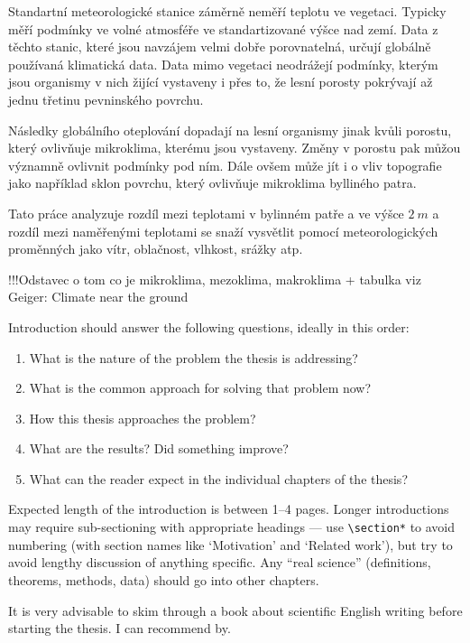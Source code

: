 Standartní meteorologické stanice záměrně neměří teplotu ve vegetaci. Typicky měří podmínky ve volné atmosféře ve standartizované výšce nad zemí. Data z těchto stanic, které jsou navzájem velmi dobře porovnatelná, určují globálně používaná klimatická data. Data mimo vegetaci neodrážejí podmínky, kterým jsou organismy v nich žijící vystaveny i přes to, že lesní porosty pokrývají až jednu třetinu pevninského povrchu.



Následky globálního oteplování dopadají na lesní organismy jinak kvůli porostu, který ovlivňuje mikroklima, kterému jsou vystaveny. Změny v porostu pak můžou významně ovlivnit podmínky pod ním. Dále ovšem může jít i o vliv topografie jako například sklon povrchu, který ovlivňuje mikroklima bylliného patra. 

Tato práce analyzuje rozdíl mezi teplotami v bylinném patře a ve výšce $\SI{2}{m}$ a rozdíl mezi naměřenými teplotami se snaží vysvětlit pomocí meteorologických proměnných jako vítr, oblačnost, vlhkost, srážky atp. 


!!!Odstavec o tom co je mikroklima, mezoklima, makroklima + tabulka viz Geiger: Climate near the ground



Introduction should answer the following questions, ideally in this order:
\begin{enumerate}
\item What is the nature of the problem the thesis is addressing?
\item What is the common approach for solving that problem now?
\item How this thesis approaches the problem?
\item What are the results? Did something improve?
\item What can the reader expect in the individual chapters of the thesis?
\end{enumerate}

Expected length of the introduction is between 1--4 pages. Longer introductions may require sub-sectioning with appropriate headings --- use \texttt{\textbackslash{}section*} to avoid numbering (with section names like `Motivation' and `Related work'), but try to avoid lengthy discussion of anything specific. Any ``real science'' (definitions, theorems, methods, data) should go into other chapters.

It is very advisable to skim through a book about scientific English writing before starting the thesis. I can recommend by.
